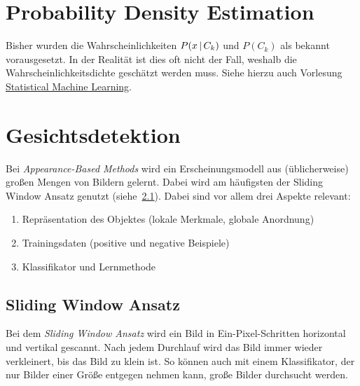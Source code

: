 	\section{Probability Density Estimation}
		Bisher wurden die Wahrscheinlichkeiten \( P(x \,\vert\, C_k) \) und \( P(C_k) \) als bekannt vorausgesetzt. In der Realität ist dies oft nicht der Fall, weshalb die Wahrscheinlichkeitsdichte geschätzt werden muss. Siehe hierzu auch Vorlesung \href{https://fabian.damken.net/summaries/cs/elective/vc/statml/}{Statistical Machine Learning}.

	\section{Gesichtsdetektion}
		Bei \emph{Appearance-Based Methods} wird ein Erscheinungsmodell aus (üblicherweise) großen Mengen von Bildern gelernt. Dabei wird am häufigsten der Sliding Window Ansatz genutzt (siehe~\ref{sec:slidingwindow}). Dabei sind vor allem drei Aspekte relevant:
		\begin{enumerate}
			\item Repräsentation des Objektes (lokale Merkmale, globale Anordnung)
			\item Trainingsdaten (positive und negative Beispiele)
			\item Klassifikator und Lernmethode
		\end{enumerate}

		\subsection{Sliding Window Ansatz}
			\label{sec:slidingwindow}
			
			Bei dem \emph{Sliding Window Ansatz} wird ein Bild in Ein-Pixel-Schritten horizontal und vertikal gescannt. Nach jedem Durchlauf wird das Bild immer wieder verkleinert, bis das Bild zu klein ist. So können auch mit einem Klassifikator, der nur Bilder einer Größe entgegen nehmen kann, große Bilder durchsucht werden.

